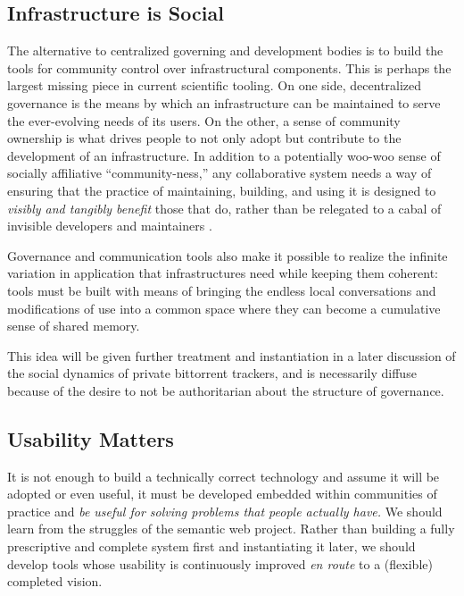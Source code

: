 \documentclass[notoc]{tufte-book}
\begin{document}
\subsection{Infrastructure is
Social}

The alternative to centralized governing and development bodies is to
build the tools for community control over infrastructural components.
This is perhaps the largest missing piece in current scientific tooling.
On one side, decentralized governance is the means by which an
infrastructure can be maintained to serve the ever-evolving needs of its
users. On the other, a sense of community ownership is what drives
people to not only adopt but contribute to the development of an
infrastructure. In addition to a potentially woo-woo sense of socially
affiliative ``community-ness,'' any collaborative system needs a way of
ensuring that the practice of maintaining, building, and using it is
designed to \emph{visibly and tangibly benefit} those that do, rather
than be relegated to a cabal of invisible developers and maintainers
\citep{grudinGroupwareSocialDynamics1994, randallDistributedOntologyBuilding2011} .

Governance and communication tools also make it possible to realize the
infinite variation in application that infrastructures need while
keeping them coherent: tools must be built with means of bringing the
endless local conversations and modifications of use into a common space
where they can become a cumulative sense of shared memory.

This idea will be given further treatment and instantiation in a later
discussion of the social dynamics of private bittorrent trackers, and is
necessarily diffuse because of the desire to not be authoritarian about
the structure of governance.


\subsection{Usability Matters}

It is not enough to build a technically correct technology and assume it
will be adopted or even useful, it must be developed embedded within
communities of practice and \emph{be useful for solving problems that
people actually have.} We should learn from the struggles of the
semantic web project. Rather than building a fully prescriptive and
complete system first and instantiating it later, we should develop
tools whose usability is continuously improved \emph{en route} to a
(flexible) completed vision.
\end{document}
